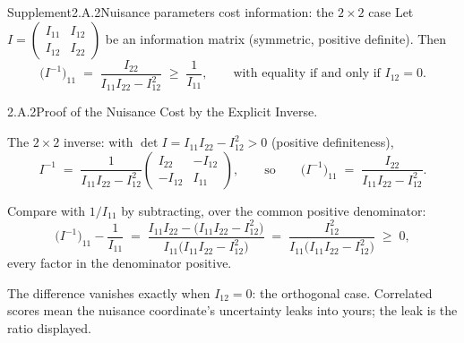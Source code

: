 \documentclass[main.tex]{subfiles}
\begin{document}
\begin{ObjL}{Supplement}{2.A.2}{Nuisance parameters cost information: the $2\times2$ case}
Let $I=\begin{pmatrix} I_{11} & I_{12}\\ I_{12} & I_{22}\end{pmatrix}$ be an information
matrix (symmetric, positive definite). Then
\[ \big(I^{-1}\big)_{11} \;=\; \frac{I_{22}}{I_{11}I_{22}-I_{12}^2}
   \;\ge\; \frac{1}{I_{11}} ,
   \qquad\text{with equality if and only if } I_{12}=0 . \]
\end{ObjL}
\begin{Prf}{2.A.2}{Proof of the Nuisance Cost by the Explicit Inverse.}{}
\item The $2\times2$ inverse: with $\det I=I_{11}I_{22}-I_{12}^2>0$ (positive
      definiteness),
      \[ I^{-1} \;=\; \frac{1}{I_{11}I_{22}-I_{12}^2}
         \begin{pmatrix} I_{22} & -I_{12}\\ -I_{12} & I_{11} \end{pmatrix} ,
         \qquad\text{so}\qquad
         \big(I^{-1}\big)_{11} \;=\; \frac{I_{22}}{I_{11}I_{22}-I_{12}^2} . \]
\item Compare with $1/I_{11}$ by subtracting, over the common positive denominator:
      \[ \big(I^{-1}\big)_{11} - \frac{1}{I_{11}}
         \;=\; \frac{I_{11}I_{22} - \big(I_{11}I_{22}-I_{12}^2\big)}
         {I_{11}\big(I_{11}I_{22}-I_{12}^2\big)}
         \;=\; \frac{I_{12}^2}{I_{11}\big(I_{11}I_{22}-I_{12}^2\big)} \;\ge\; 0 , \]
      every factor in the denominator positive.
\item The difference vanishes exactly when $I_{12}=0$: the orthogonal case. Correlated
      scores mean the nuisance coordinate's uncertainty leaks into yours; the leak is the
      ratio displayed.
\end{Prf}
\end{document}
